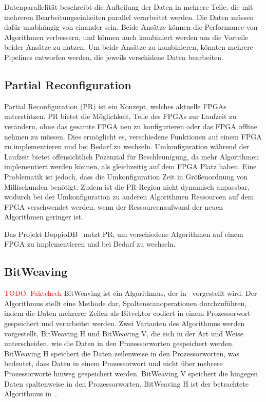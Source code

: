 \documentclass[conference]{IEEEtran}
\newcommand{\todo}[1]{\textcolor{red}{TODO: #1}}
\begin{document}
Datenparallelität beschreibt die Aufteilung der Daten in mehrere Teile, die mit mehreren Bearbeitungseinheiten parallel verarbeitet werden. Die Daten müssen dafür unabhängig von einander sein.
Beide Ansätze können die Performance von Algorithmen verbessern, und können auch kombiniert werden um die Vorteile beider Ansätze zu nutzen. Um beide Ansätze zu kombinieren, könnten mehrere Pipelines entworfen werden,
die jeweils verschidene Daten bearbeiten.



\subsection{Partial Reconfiguration}
Partial Reconfiguration (PR) ist ein Konzept, welches aktuelle FPGAs unterstützen. PR bietet die Möglichkeit, Teile des FPGAs zur Laufzeit zu verändern,
ohne das gesamte FPGA neu zu konfigurieren oder das FPGA offline nehmen zu müssen. Dies ermöglicht es, verschiedene Funktionen auf einem FPGA zu implementieren
und bei Bedarf zu wechseln. Umkonfiguration während der Laufzeit bietet offensichtlich Pozenzial für Beschleunigung, da mehr Algorithmen implementiert
werden können, als gleichzeitig auf dem FPGA Platz haben. Eine Problematik ist jedoch, dass die Umkonfiguration Zeit in Größenordnung von Millisekunden benötigt.
Zudem ist die PR-Region nicht dynamisch anpassbar, wodurch bei der Umkonfiguration zu anderen Algorithmen Ressourcen auf dem FPGA verschwendet werden, wenn der
Ressourcenaufwand der neuen Algorithmen geringer ist.

Das Projekt DoppioDB~\cite{li_bitweaving_2013} nutzt PR, um verschiedene Algorithmen auf einem FPGA zu implementieren und bei Bedarf zu wechseln.

\subsection{BitWeaving}
\todo{Faktcheck}
BitWeaving ist ein Algorithmus, der in~\cite{li_bitweaving_2013} vorgestellt wird. Der Algorithmus stellt eine Methode dar, Spaltenscanoperationen durchzuführen, indem
die Daten mehrerer Zeilen als Bitvektor codiert in einem Prozessorwort gespeichert und verarbeitet werden. Zwei Varianten des Algorithmus werden vorgestellt, BitWeaving H und BitWeaving V,
die sich in der Art und Weise unterscheiden, wie die Daten in den Prozessorworten gespeichert werden. BitWeaving H speichert die Daten zeilenweise in den Prozessorworten, was bedeutet, dass
Daten in einem Prozessorwort und nicht über mehrere Prozessorworte hinweg gespeichert werden. BitWeaving V speichert die hingegen Daten spaltenweise in den Prozessorworten. BitWeaving H ist
der betrachtete Algorithmus in~\cite{lisa_column_2018}.
\end{document}
